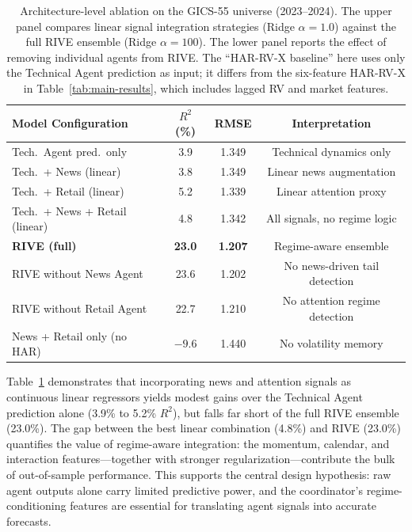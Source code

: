 \documentclass[review]{elsarticle}
\begin{document}
\begin{table}[H]
\centering
\caption{Architecture-level ablation on the GICS-55 universe (2023--2024). The upper panel compares linear signal integration strategies (Ridge $\alpha=1.0$) against the full RIVE ensemble (Ridge $\alpha=100$). The lower panel reports the effect of removing individual agents from RIVE. The ``HAR-RV-X baseline'' here uses only the Technical Agent prediction as input; it differs from the six-feature HAR-RV-X in Table~\ref{tab:main-results}, which includes lagged RV and market features.} %
\label{tab:ablation-arch}
\begin{tabular}{lccc}
\toprule
Model Configuration & $R^2$ (\%) & RMSE & Interpretation \\
\midrule
Tech.\ Agent pred.\ only & 3.9 & 1.349 & Technical dynamics only \\
Tech.\ + News (linear) & 3.8 & 1.349 & Linear news augmentation \\
Tech.\ + Retail (linear) & 5.2 & 1.339 & Linear attention proxy \\
Tech.\ + News + Retail (linear) & 4.8 & 1.342 & All signals, no regime logic \\
\textbf{RIVE (full)} & \textbf{23.0} & \textbf{1.207} & Regime-aware ensemble \\
\midrule
RIVE without News Agent & 23.6 & 1.202 & No news-driven tail detection \\
RIVE without Retail Agent & 22.7 & 1.210 & No attention regime detection \\
News + Retail only (no HAR) & $-9.6$ & 1.440 & No volatility memory \\
\bottomrule
\end{tabular}
\end{table}

Table~\ref{tab:ablation-arch} demonstrates that incorporating news and attention signals as continuous linear regressors yields modest gains over the Technical Agent prediction alone (3.9\% to 5.2\% $R^2$), but falls far short of the full RIVE ensemble (23.0\%). The gap between the best linear combination (4.8\%) and RIVE (23.0\%) quantifies the value of regime-aware integration: the momentum, calendar, and interaction features---together with stronger regularization---contribute the bulk of out-of-sample performance. This supports the central design hypothesis: raw agent outputs alone carry limited predictive power, and the coordinator's regime-conditioning features are essential for translating agent signals into accurate forecasts. %
\end{document}
